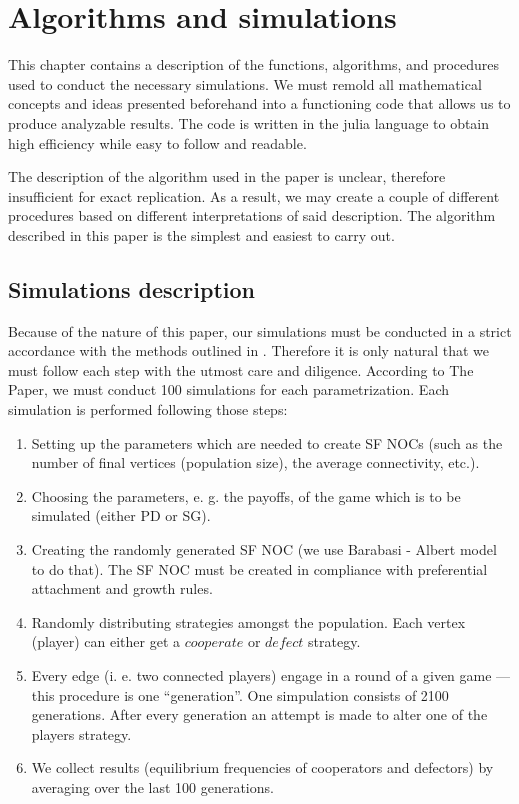 \documentclass[english, twoside, 12pt, a4paper]{article}
\theoremstyle{definition}
\theoremstyle{plain}
\theoremstyle{remark}
\begin{document}
\section{Algorithms and simulations}

This chapter contains a description of the functions, algorithms, and procedures used to conduct the necessary simulations. We must remold all mathematical concepts and ideas presented beforehand into a functioning code that allows us to produce analyzable results. The code is written in the julia language to obtain high efficiency while easy to follow and readable.

The description of the algorithm used in the paper \cite{santos2005scale} is unclear, therefore insufficient for exact replication. As a result, we may create a couple of different procedures based on different interpretations of said description. The algorithm described in this paper is the simplest and easiest to carry out. 

\subsection{Simulations description}

Because of the nature of this paper, our simulations must be conducted in a strict accordance with the methods outlined
in \cite{santos2005scale}. Therefore it is only natural that we must follow each step with the utmost care and diligence. According to The Paper, we must conduct 100 simulations 
for each parametrization. Each simulation is performed following those steps:
\begin{enumerate}
  \item Setting up the parameters which are needed to create SF NOCs (such as the number of final vertices (population size), the average connectivity, etc.).
  \item Choosing the parameters, e. g. the payoffs, of the game which is to be simulated (either PD or SG).
  \item Creating the randomly generated SF NOC (we use Barabasi - Albert model to do that). The SF NOC must be created in compliance with preferential attachment and 
  growth rules.
  \item Randomly distributing strategies amongst the population. Each vertex (player) can either get a $cooperate$ or $defect$ strategy.
  \item Every edge (i. e. two connected players) engage in a round of a given game --- this procedure is one \enquote{generation}. One simpulation consists of 2100 generations. After every generation an attempt is made to alter one of the players strategy.
  \item We collect results (equilibrium frequencies of cooperators and defectors) by averaging over the last 100 generations.
\end{enumerate}
\end{document}
